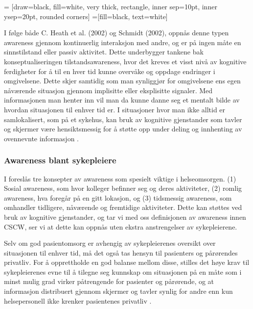  = [draw=black, fill=white, very thick,
    rectangle, inner sep=10pt, inner ysep=20pt, rounded corners]
 =[fill=black, text=white]
%

\noindent
I følge både C. Heath et al. (2002) \nocite{Heath02} og Schmidt (2002), oppnås denne typen awareness gjennom kontinuerlig interaksjon med andre, og er på ingen måte en sinnstilstand eller passiv aktivitet. Dette underbygger tankene bak konseptualiseringen tilstandsawareness, hvor det kreves et visst nivå av kognitive ferdigheter for å til en hver tid kunne overvåke og oppdage endringer i omgivelsene. Dette skjer samtidig som man synliggjør for omgivelsene ens egen nåværende situasjon gjennom implisitte eller eksplisitte signaler. Med informasjonen man henter inn vil man da kunne danne seg et mentalt bilde av hvordan situasjonen til enhver tid er. I situasjoner hvor man ikke alltid er samlokalisert, som på et sykehus, kan bruk av kognitive gjenstander som tavler og skjermer være hensiktsmessig for å støtte opp under deling og innhenting av ovennevnte informasjon \cite{Bardram04}. 

\subsubsection{Awareness blant sykepleiere}
I \cite{Randell} foreslås tre konsepter av awareness som spesielt viktige i helseomsorgen. (1) Sosial awareness, som hvor kolleger befinner seg og deres aktiviteter, (2) romlig awareness, hva foregår på en gitt lokasjon, og (3) tidsmessig awareness, som omhandler tidligere, nåværende og fremtidige aktiviteter. 
Dette kan støttes ved bruk av kognitive gjenstander, og tar vi med oss definisjonen av awareness innen CSCW, ser vi at dette kan oppnås uten ekstra anstrengelser av sykepleierene.

\noindent
Selv om god pasientomsorg er avhengig av sykepleierenes oversikt over situasjonen til enhver tid, må det også tas hensyn til pasienters og pårørendes privatliv. For å opprettholde en god balanse mellom disse, stilles det høye krav til sykepleierenes evne til å tilegne seg kunnskap om situasjonen på en måte som i minst mulig grad virker påtrengende for pasienter og pårørende, og at informasjon distribuert gjennom skjermer og tavler synlig for andre enn kun helsepersonell ikke krenker pasientenes privatliv \cite{Ebright10}.

